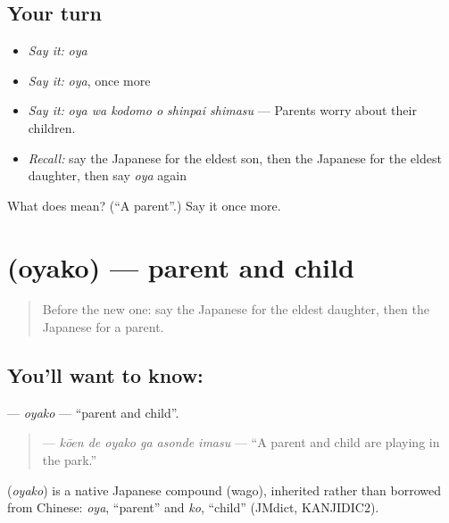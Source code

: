 \subsection*{Your turn}
\begin{itemize}
\raggedright
  \item \emph{Say it:} \emph{oya}
  \item \emph{Say it:} \emph{oya}, once more
  \item \emph{Say it:} \emph{oya wa kodomo o shinpai shimasu} — Parents worry about their children.
  \item \emph{Recall:} say the Japanese for the eldest son, then the Japanese for the eldest daughter, then say \emph{oya} again
\end{itemize}

\begin{tcolorbox}[breakable,colback=teal!4,colframe=teal!35!black,title={Before you move on}]
What does  mean? (\textquotedblleft{}A parent\textquotedblright{}.) Say it once more.
\end{tcolorbox}
\section[\texorpdfstring{\ja{おやこ} (oyako)}{おやこ (oyako)}]{ (oyako) — parent and child}

\label{lesson:JA-C477-oyako}



\begin{quote}
Before the new one: say the Japanese for the eldest daughter, then the Japanese for a parent.
\end{quote}

\subsection*{You'll want to know: }
\textbf{} — \emph{oyako} — \textquotedblleft{}parent and child\textquotedblright{}.

\begin{quote}
\textbf{  } — \emph{kōen de oyako ga asonde imasu} — \textquotedblleft{}A parent and child are playing in the park.\textquotedblright{}
\end{quote}

\begin{cousinweb}
\textbf{} (\emph{oyako}) is a native Japanese compound (wago), inherited rather than borrowed from Chinese: \emph{oya}, \textquotedblleft{}parent\textquotedblright{} and \emph{ko}, \textquotedblleft{}child\textquotedblright{} (JMdict, KANJIDIC2).
\end{cousinweb}


